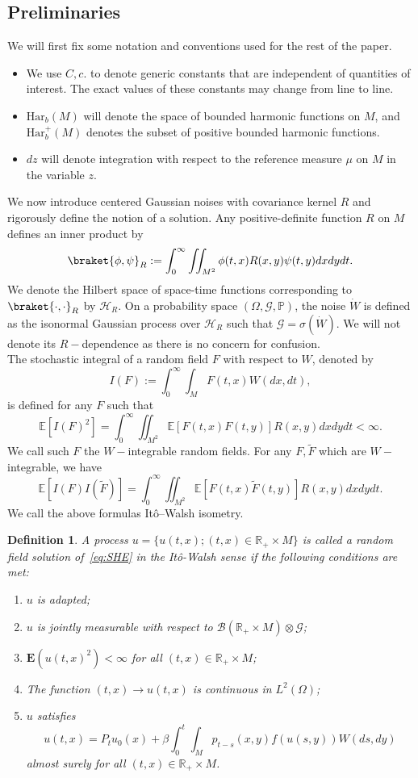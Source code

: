 \documentclass{article}
\newtheorem{definition}[theorem]{Definition}
\numberwithin{theorem}{section}
\def\PP{\mathbb{P}} %
\def\EE{\mathbb{E}} %
\begin{document}
\subsection{Preliminaries}\label{sec:prelim}
We will first fix some notation and conventions used for the rest of the paper.
\begin{itemize}
    \item We use $C,c$. to denote generic constants that are independent of quantities of interest. The exact values of these constants may change from line to line.
    \item $\mathrm{Har}_b(M)$ will denote the space of bounded harmonic functions on $M$, and $\mathrm{Har}^+_b(M)$ denotes the subset of positive bounded harmonic functions.
    \item $dz$ will denote integration with respect to the reference measure $\mu$ on $M$ in the variable $z$.
\end{itemize}
We now introduce centered Gaussian noises with covariance kernel $R$ and rigorously define the notion of a solution. Any positive-definite function $R$ on $M$ defines an inner product by \[\braket{\phi,\psi}_R:=\int_{0}^{\infty}\iint_{M^2}\phi(t,x)R(x,y)\psi(t,y)dxdydt.\]
We denote the Hilbert space of space-time functions corresponding to $\braket{\cdot,\cdot}_R$ by $\mathcal{H}_R$. On a probability space $(\Omega,\mathcal{G},\PP)$, the noise $\dot W$ is defined as the isonormal Gaussian process\cite{Nualart95TheMC} over $\mathcal{H}_R$ such that $\mathcal{G}=\sigma(\dot W)$. We will not denote its $R-$dependence as there is no concern for confusion.\\
The stochastic integral of a random field $F$ with respect to $W$, denoted by \[I(F):=\int_0^\infty\int_M F(t,x) W(dx,dt),\]
is defined for any $F$ such that \[\EE[I(F)^2]=\int_0^\infty\iint_{M^2}\EE[F(t,x)F(t,y)]R(x,y)dxdydt<\infty.\]
We call such $F$ the $W-$integrable random fields. For any $F,\widetilde{F}$ which are $W-$integrable, we have \[\EE[I(F)I(\widetilde F)]=\int_0^\infty\iint_{M^2}\EE[F(t,x)\widetilde F(t,y)]R(x,y)dxdydt.\]
We call the above formulas It\^o--Walsh isometry.

\begin{definition}
    \label{def of Ito sol}
A process $u=\{u(t,x); (t,x)\in\mathbb{R}_{+}\times M \}$ is called a random field solution of~\eqref{eq:SHE} in the It\^o-Walsh sense \cite{Walsh86} if the following conditions are met:
\begin{enumerate}
\item $u$ is adapted;
\item $u$ is jointly measurable with respect to $\mathcal{B}(\mathbb{R}_{+}\times M )\otimes \mathcal{G}$; 
\item $\mathbf{E}(u(t,x)^2)<\infty$ for all $(t,x)\in\mathbb{R}_{+}\times M$;
\item The function $(t,x)\to u(t,x)$ is continuous in $L^2(\Omega)$;
\item $u$ satisfies \[\label{eq:SHE-mild}u(t,x)=P_tu_0(x)+\beta\int_0^t\int_M p_{t-s}(x,y)f(u(s,y))W(ds,dy)\] almost surely for all $(t,x)\in\mathbb{R}_{+}\times M$.
\end{enumerate}
\end{definition}
\end{document}
